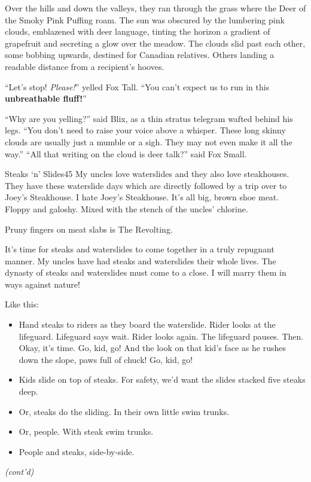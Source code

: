 \documentclass[10pt,twoside]{report}
\begin{document}
Over the hills and down the valleys, they ran through the grass where
the Deer of the Smoky Pink Puffing roam.  The sun was obscured by the
lumbering pink clouds, emblazened with deer language, tinting the
horizon a gradient of grapefruit and secreting a glow over the meadow.
The clouds slid past each other, some bobbing upwards, destined for
Canadian relatives.  Others landing a readable distance from a
recipient's hooves.

``Let's stop!  {\em Please!}'' yelled Fox Tall.  ``You can't expect us
to run in this {\bf unbreathable fluff!}''

``Why are you yelling?'' said Blix, as a thin stratus telegram wafted
behind his legs.  ``You don't need to raise your voice above a
whisper.  These long skinny clouds are usually just a mumble or a
sigh.  They may not even make it all the way.''  ``All that writing on
the cloud is deer talk?'' said Fox Small.

	\begin{sidebar}{Steaks `n' Slides}{45}
		My uncles love waterslides and they also love steakhouses. They have these waterslide days which are directly followed by a trip over to Joey's Steakhouse. I hate Joey's Steakhouse. It's all big, brown shoe meat. Floppy and galoshy. Mixed with the stench of the uncles' chlorine.\vspace{6pt}
		
		Pruny fingers on meat slabs is The Revolting.\vspace{6pt}

		It's time for steaks and waterslides to come together in a truly repugnant manner. My uncles have had steaks and waterslides their whole lives. The dynasty of steaks and waterslides must come to a close. I will marry them in ways against nature!\vspace{6pt}
		
		Like this:
		\begin{itemize}
			\item Hand steaks to riders as they board the waterslide. Rider looks at the lifeguard. Lifeguard says wait. Rider looks again. The lifeguard pauses. Then. Okay, it's time. Go, kid, go! And the look on that kid's face as he rushes down the slope, paws full of chuck! Go, kid, go!
			\item Kids slide on top of steaks. For safety, we'd want the slides stacked five steaks deep.
			\item Or, steaks do the sliding. In their own little swim trunks.
			\item Or, people. With steak swim trunks.
			\item People and steaks, side-by-side.
		\end{itemize}
		\textit{(cont'd)}
	\end{sidebar}
\end{document}
